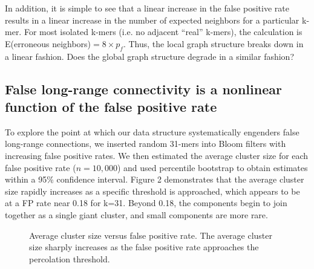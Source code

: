 \documentclass[12pt]{article} \usepackage{simplemargins}
\begin{document}
In addition, it is simple to see that a linear increase in the false 
positive rate results in a linear increase in the number of expected 
neighbors for a particular k-mer. For most isolated k-mers (i.e. no adjacent 
``real'' k-mers), the calculation is 
E(erroneous neighbors)$ = 8 \times p_f$. Thus, the local graph 
structure breaks down in a linear fashion.  Does the global graph structure
degrade in a similar fashion?

\subsection{False long-range connectivity is a nonlinear function of the false positive rate}

To explore the point at which our data structure systematically
engenders false long-range connections, we inserted random 31-mers
into Bloom filters with increasing false positive rates.  We then
estimated the average cluster size for each false positive rate
($n=10,000$) and used percentile bootstrap to obtain estimates within a 
95\% confidence interval. Figure 2 demonstrates that the average cluster size
rapidly increases as a specific threshold is approached, which appears
to be at a FP rate near 0.18 for k=31. Beyond 0.18, the components
begin to join together as a single giant cluster, and small components
are more rare.

\begin{figure}
\caption{Average cluster size versus false positive rate. The average 
cluster size sharply increases as the false positive 
rate approaches the percolation threshold.
}
\end{figure}
\end{document}
